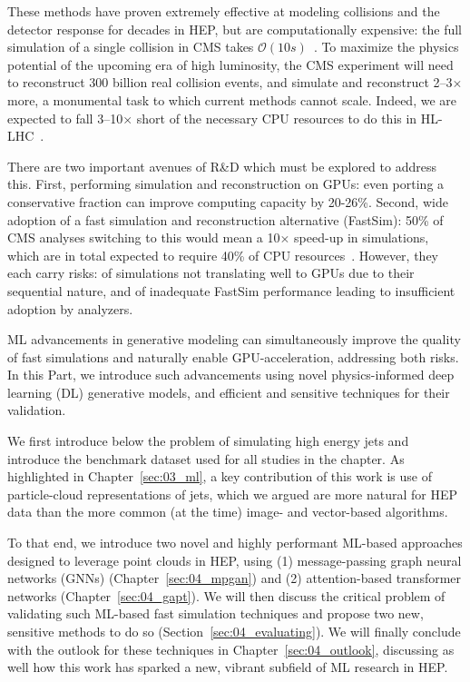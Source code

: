 These methods have proven extremely effective at modeling collisions and the detector response for decades in HEP, but are computationally expensive: the full simulation of a single collision in CMS takes $\mathcal O(10\unit{s})$~\cite{Pedro:2018jqu}.
To maximize the physics potential of the upcoming era of high luminosity, the CMS experiment will need to reconstruct 300 billion real collision events, and
simulate and reconstruct 2--3$\times$ more, a monumental task to which current methods cannot scale.
Indeed, we are expected to fall 3--10$\times$ short of the necessary CPU resources to do this in HL-LHC~\cite{CMS:2815292}.

There are two important avenues of R\&D which must be explored to address this.
First, performing simulation and reconstruction on GPUs: even porting a conservative fraction can improve computing capacity by 20-26\%.
Second, wide adoption of a fast simulation and reconstruction alternative (FastSim): 50\% of CMS analyses switching to this would mean a 10$\times$ speed-up in simulations, which are in total expected to require 40\% of CPU resources~\cite{CMS:2815292}.
However, they each carry risks: of simulations not translating well to GPUs due to their sequential nature, and of inadequate FastSim performance leading to insufficient adoption by analyzers.

ML advancements in generative modeling can simultaneously improve the quality of fast simulations and naturally enable GPU-acceleration, addressing both risks.
In this Part, we introduce such advancements using novel physics-informed deep learning (DL) generative models, and efficient and sensitive techniques for their validation.

We first introduce below the problem of simulating high energy jets and introduce the \jetnet benchmark dataset used for all studies in the chapter.
As highlighted in Chapter~\ref{sec:03_ml}, a key contribution of this work is use of particle-cloud representations of jets, which we argued are more natural for HEP data than the more common (at the time) image- and vector-based algorithms.

To that end, we introduce two novel and highly performant ML-based approaches designed to leverage point clouds in HEP, using (1) message-passing graph neural networks (GNNs) (Chapter~\ref{sec:04_mpgan}) and (2) attention-based transformer networks (Chapter~\ref{sec:04_gapt}).
We will then discuss the critical problem of validating such ML-based fast simulation techniques and propose two new, sensitive methods to do so (Section~\ref{sec:04_evaluating}).
We will finally conclude with the outlook for these techniques in Chapter~\ref{sec:04_outlook}, discussing as well how this work has sparked a new, vibrant subfield of ML research in HEP.

